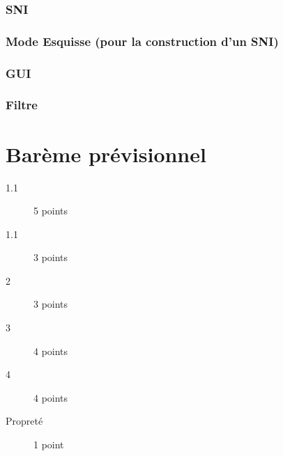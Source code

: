 \documentclass[12pt]{article}
\begin{document}
\subsubsection*{SNI}

\fbox{ \begin{minipage}{6in} \hfill\vspace{1.5in} \end{minipage} }


\subsubsection*{Mode Esquisse (pour la construction d'un SNI)}

\fbox{ \begin{minipage}{6in} \hfill\vspace{1.5in} \end{minipage} }

\subsubsection*{GUI}

\fbox{ \begin{minipage}{6in} \hfill\vspace{1.5in} \end{minipage} }

\subsubsection*{Filtre}

\fbox{ \begin{minipage}{6in} \hfill\vspace{1.5in} \end{minipage} }

\section*{Bar\`eme prévisionnel}

\begin{description}
\item[1.1] 5 points
\item[1.1] 3 points
\item[2] 3 points
\item[3] 4 points
\item[4] 4 points
\item[Propret\'e]  1 point
\end{description}
\end{document}

